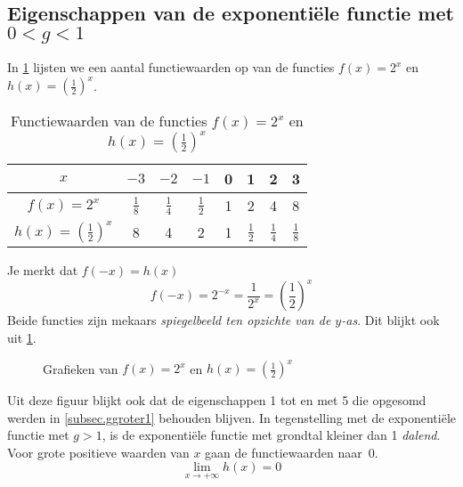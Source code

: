 \subsection[Eigenschappen van de exponenti\"{e}le functie met $g<1$]{Eigenschappen van de exponenti\"{e}le functie met \boldmath$0<g<1$\unboldmath}
In \cref{tab:expfunckleiner1} lijsten we een aantal functiewaarden op van de functies $f(x)=2^x$ en $h(x)=\left(\frac12\right)^x$.
\begin{table}[htdp]
\caption{Functiewaarden van de functies $f(x)=2^x$ en $h(x)=\left(\frac12\right)^x$}
\centering
\begin{tabular}{c|ccccccc}
$x$&$-3$&$-2$&$-1$&0&1&2&3\\ 
\midrule
$f(x)=2^x$&$\frac18$&$\frac14$&$\frac12$&1&2&4&8\\
$h(x)=\left(\frac12\right)^x$&8&4&2&1&$\frac12$&$\frac14$&$\frac18$
\end{tabular}
\label{tab:expfunckleiner1}
\end{table}%

Je merkt dat $f(-x)=h(x)$ 
\begin{displaymath}
    f(-x)=2^{-x}=\frac{1}{2^{x}} =\left(\frac{1}{2}\right)^{x}
\end{displaymath}
Beide functies zijn mekaars \emph{spiegelbeeld ten opzichte van de $y$-as}. Dit blijkt ook uit \cref{fig:1/2x}.
\begin{figure}[htbp]
    \centering
    \caption{Grafieken van $f(x)=2^{x}$ en $h(x)={(\frac{1}{2})}^{x}$}
    \label{fig:1/2x}
\end{figure}
Uit deze figuur blijkt ook dat de eigenschappen 1 tot en met 5 die opgesomd werden in \cref{subsec.ggroter1} behouden blijven. In tegenstelling met de exponenti\"ele functie met $g>1$, is de exponenti\"ele functie met grondtal kleiner dan 1 \emph{dalend}. Voor grote  positieve waarden van $x$ gaan de functiewaarden naar~0.
\[
\lim_{x\rightarrow+\infty}h(x)=0
\]


